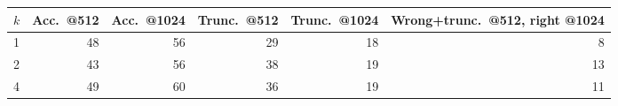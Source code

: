 \begin{tabular}{lrrrrr}
\toprule
$k$ & Acc.\ @512 & Acc.\ @1024 & Trunc.\ @512 & Trunc.\ @1024 & Wrong+trunc.\ @512, right @1024 \\
\midrule
1 & 48 & 56 & 29 & 18 & 8 \\
2 & 43 & 56 & 38 & 19 & 13 \\
4 & 49 & 60 & 36 & 19 & 11 \\
\bottomrule
\end{tabular}
